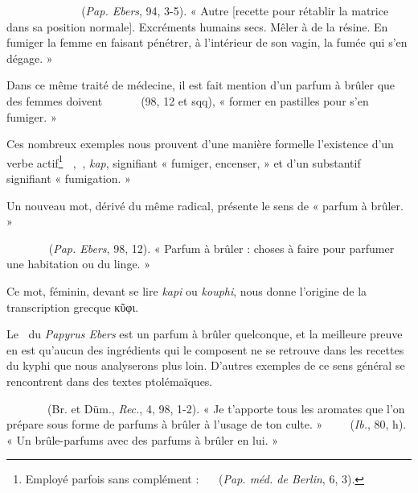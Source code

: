\documentclass[a4paper, 11pt, oneside, landscape]{article}
\newcommand*\hieroAAAA{\raisebox{0.8ex}{}}
\newcommand*\hieroAAAB{}
\newcommand*\hieroAAAC{\raisebox{0.6ex}{}}
\newcommand*\hieroAAAD{}
\newcommand*\hieroAAAH{}
\newcommand*\hieroAAAI{}
\newcommand*\hieroAAAL{}
\newcommand*\hieroAAAM{}
\newcommand*\hieroAAAN{}
\newcommand*\hieroAAAO{}
\newcommand*\hieroAAAR{}
\newcommand*\hieroAAAT{}
\newcommand*\hieroAABK{}
\newcommand*\hieroAABV{}
\newcommand*\hieroAABX{}
\newcommand*\hieroAABZ{}
\newcommand*\hieroAACA{}
\newcommand*\hieroAACB{}
\newcommand*\hieroAACE{}
\newcommand*\hieroAACK{\raisebox{0.5ex}{}}
\newcommand*\hieroAACL{}
\newcommand*\hieroAACM{}
\newcommand*\hieroAACN{}
\newcommand*\hieroAACO{}
\newcommand*\hieroAACP{}
\newcommand*\hieroAACQ{}
\newcommand*\hieroAACR{}
\newcommand*\hieroAACS{}
\newcommand*\hieroAACT{}
\newcommand*\hieroAACU{}
\newcommand*\hieroAACV{}
\newcommand*\hieroAACW{\raisebox{0.3ex}{}}
\newcommand*\hieroAACX{}
\newcommand*\hieroAACY{}
\newcommand*\hieroAACZ{}
\newcommand*\hieroAADA{}
\newcommand*\hieroAADB{}
\newcommand*\hieroAADC{}
\newcommand*\hieroAADD{\raisebox{0.9ex}{}}
\newcommand*\hieroAADE{}
\newcommand*\hieroAADF{}
\newcommand*\hieroAADG{}
\newcommand*\hieroAADH{}
\newcommand*\hieroAADI{}
\newcommand*\hieroAADJ{}
\newcommand*\hieroAADK{}
\newcommand*\hieroAADL{}
\newcommand*\hieroAADM{\raisebox{0.5ex}{}}
\newcommand*\hieroAADN{}
\newcommand*\hieroAADO{}
\newcommand*\hieroAADP{}
\newcommand*\hieroAADQ{}
\newcommand*\hieroAADR{}
\newcommand*\hieroAADS{}
\newcommand*\hieroAADT{}
\newcommand*\hieroAADU{}
\newcommand*\hieroAADV{}
\newcommand*\hieroAADW{}
\newcommand*\hieroAADX{}
\newcommand*\hieroAADY{}
\newcommand*\hieroAADZ{}
\newcommand*\hieroAAEA{}
\newcommand*\hieroAAEB{}
\newcommand*\hieroAAEC{}
\newcommand*\hieroAAED{}
\newcommand*\hieroAAEE{}
\newcommand*\hieroAAEF{}
\begin{document}
$\hieroAABK\:\hieroAACK\:\hieroAACL\:\hieroAACE\:\hieroAACM\:\hieroAACN\:\hieroAACO\:\hieroAACP\:\hieroAACQ\:\hieroAACR\:\hieroAAAI\:\hieroAACS\:\hieroAACT\:\hieroAAAD\:\hieroAACU\:\hieroAACV\:\hieroAACR\:\hieroAAAH\:\hieroAACQ\:\hieroAACW\:\hieroAACX\:\hieroAAAT\:\hieroAACY\:\hieroAACA\:\hieroAAAM\:\hieroAACZ\:\hieroAADA\:\hieroAADB\:\hieroAADC$ (\emph{Pap. Ebers}, 94, 3-5). « Autre [recette pour rétablir la matrice dans sa position normale]. Excréments humains secs. Mêler à de la résine. En fumiger la femme en faisant pénétrer, à l'intérieur de son vagin, la fumée qui s'en dégage. »

Dans ce même traité de médecine, il est fait mention d'un parfum à brûler que des femmes doivent $\hieroAADD\:\hieroAAAN\:\hieroAAAM\:\hieroAADE\:\hieroAAAL\:\hieroAABX\:\hieroAAAD\:\hieroAACA\:\hieroAADF\:\hieroAADG\:\hieroAAAM\:\hieroAAAN\:\hieroAADG$ (98, 12 et sqq), « former en pastilles pour s'en fumiger. »

Ces nombreux exemples nous prouvent d'une manière formelle l'existence d'un verbe actif\footnote{Employé parfois sans complément : $\hieroAACQ\:\hieroAAAN\:\hieroAABZ\:\hieroAACA\:\hieroAACB\:\hieroAACA$ (\emph{Pap. méd. de Berlin}, 6, 3).} $\hieroAAAA\:\hieroAAAB\:\hieroAAAO$, $\hieroAAAD\:\hieroAACA$, \emph{kap}, signifiant « fumiger, encenser, » et d'un substantif $\hieroAACB\:\hieroAACA$ signifiant « fumigation. » 

Un nouveau mot, dérivé du même radical, présente le sens de « parfum à brûler. »

$\hieroAADH\:\hieroAACA\:\hieroAADI\:\hieroAADJ\:\hieroAAAH\:\hieroAADK\:\hieroAAAN\:\hieroAADL\:\hieroAAAH\:\hieroAACY\:\hieroAADM\:\hieroAADN\:\hieroAADO\:\hieroAADP\:\hieroAAAC\:\hieroAAAL$ (\emph{Pap. Ebers}, 98, 12). « Parfum à brûler : choses à faire pour parfumer une habitation ou du linge. »

Ce mot, féminin, devant se lire \emph{kapi} ou \emph{kouphi}, nous donne l'origine de la transcription grecque κῦφι.

Le $\hieroAADH\:\hieroAACA$ du \emph{Papyrus Ebers} est un parfum à brûler quelconque, et la meilleure preuve en est qu'aucun des ingrédients qui le composent ne se retrouve dans les recettes du kyphi que nous analyserons plus loin. D'autres exemples de ce sens général se rencontrent dans des textes ptolémaïques.

$\hieroAADQ\:\hieroAADR\:\hieroAADS\:\hieroAADT\:\hieroAAAR\:\hieroAADU\:\hieroAADV\:\hieroAACA\:\hieroAADW\:\hieroAAAR\:\hieroAADX\:\hieroAAAI\:\hieroAADY\:\hieroAADZ\:\hieroAAEA\:\hieroAAEB$ (Br. et Düm., \emph{Rec.}, 4, 98, 1-2). « Je t'apporte tous les aromates que l'on prépare sous forme de parfums à brûler à l'usage de ton culte. » $\hieroAAEC\:\hieroAAAR\:\hieroAAED\:\hieroAAEE\:\hieroAAAR\:\hieroAAEE\:\hieroAAAR\:\hieroAABV\:\hieroAAEF$ (\emph{Ib.}, 80, h). « Un brûle-parfums avec des parfums à brûler en lui. »
\end{document}
